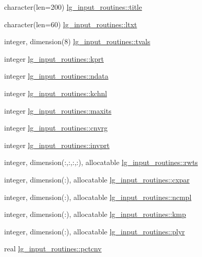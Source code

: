 \begin{DoxyCompactItemize}
\item 
character(len=200) \hyperlink{namespacelg__input__routines_a1ef30ce0b5dc7f1606ca274a96f4f69b}{lg\+\_\+input\+\_\+routines\+::title}
\item 
character(len=60) \hyperlink{namespacelg__input__routines_a5c20852fa900259b8802ce90a90242fd}{lg\+\_\+input\+\_\+routines\+::ltxt}
\item 
integer, dimension(8) \hyperlink{namespacelg__input__routines_a9effaf2dd14fcded391b9aa0024209e7}{lg\+\_\+input\+\_\+routines\+::tvals}
\item 
integer \hyperlink{namespacelg__input__routines_a3f207750b44b385fd4cfdfee777d99a7}{lg\+\_\+input\+\_\+routines\+::kprt}
\item 
integer \hyperlink{namespacelg__input__routines_af3dfe10c558a9f2f5ef8e1f6cb8f2770}{lg\+\_\+input\+\_\+routines\+::ndata}
\item 
integer \hyperlink{namespacelg__input__routines_ad615d7fb943281d8f06d4c1f45401a53}{lg\+\_\+input\+\_\+routines\+::kchnl}
\item 
integer \hyperlink{namespacelg__input__routines_a8a8ac5810a5450735ae16a17775adb2e}{lg\+\_\+input\+\_\+routines\+::maxits}
\item 
integer \hyperlink{namespacelg__input__routines_aa67064f3118bc318702e1ca97b197a05}{lg\+\_\+input\+\_\+routines\+::cnvrg}
\item 
integer \hyperlink{namespacelg__input__routines_a2efdd9d0ee189172094271241f63d28c}{lg\+\_\+input\+\_\+routines\+::invprt}
\item 
integer, dimension(\+:,\+:,\+:,\+:), allocatable \hyperlink{namespacelg__input__routines_aead04e44b19b3354442aae287652c5ac}{lg\+\_\+input\+\_\+routines\+::rwts}
\item 
integer, dimension(\+:), allocatable \hyperlink{namespacelg__input__routines_aa1ea996394cf4a5e7b496595554acf71}{lg\+\_\+input\+\_\+routines\+::cxpar}
\item 
integer, dimension(\+:), allocatable \hyperlink{namespacelg__input__routines_ac804800fe349f842e1ffe85c1a0d3410}{lg\+\_\+input\+\_\+routines\+::ncmpl}
\item 
integer, dimension(\+:), allocatable \hyperlink{namespacelg__input__routines_af32e9ed8c544fe3339169f3f1c3993d5}{lg\+\_\+input\+\_\+routines\+::kmp}
\item 
integer, dimension(\+:), allocatable \hyperlink{namespacelg__input__routines_afcc12c2fb333b7b2b66ef0d4412ce04e}{lg\+\_\+input\+\_\+routines\+::plyr}
\item 
real \hyperlink{namespacelg__input__routines_ac6b4323af4ccd6ac9f0415f7c856302f}{lg\+\_\+input\+\_\+routines\+::pctcnv}

\end{DoxyCompactItemize}
